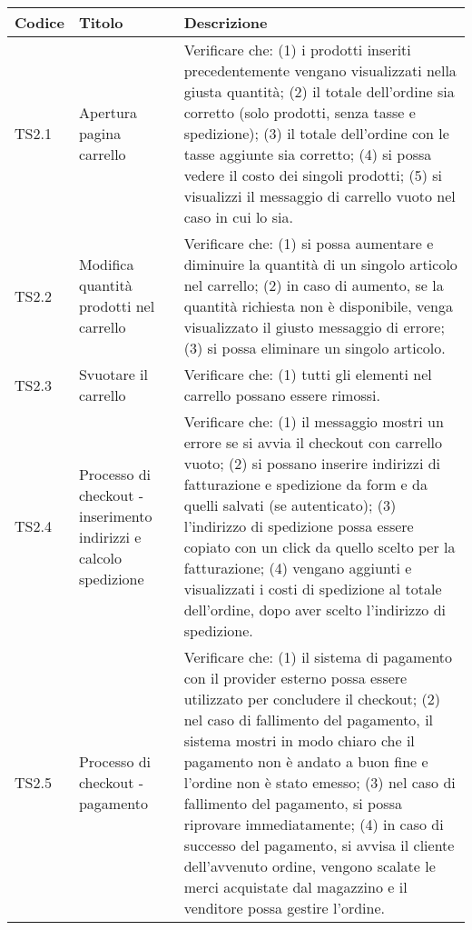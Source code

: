 \begin{center}
	\begin{longtable}{|p{1cm}|p{6.85cm}|p{7cm}|}
	\hline
	\rowcolor{lighter-grayer}
	\textbf{Codice} & \textbf{Titolo} & \textbf{Descrizione} \\
	\hline
	\endfirsthead



	\hline
	TS2.1 & Apertura pagina carrello & Verificare che: (1) i prodotti inseriti precedentemente vengano visualizzati nella giusta quantità;
													   (2) il totale dell'ordine sia corretto (solo prodotti, senza tasse e spedizione);
													   (3) il totale dell'ordine con le tasse aggiunte sia corretto;
													   (4) si possa vedere il costo dei singoli prodotti;
													   (5) si visualizzi il messaggio di carrello vuoto nel caso in cui lo sia. \\
	TS2.2 & Modifica quantità prodotti nel carrello & Verificare che:
													   (1) si possa aumentare e diminuire la quantità di un singolo articolo nel carrello;
													   (2) in caso di aumento, se la quantità richiesta non è disponibile, venga visualizzato il giusto messaggio di errore;
													   (3) si possa eliminare un singolo articolo.  \\
	TS2.3 & Svuotare il carrello & Verificare che: (1) tutti gli elementi nel carrello possano essere rimossi. \\
	TS2.4 & Processo di checkout - inserimento indirizzi e calcolo spedizione & Verificare che:
												   (1) il messaggio mostri un errore se si avvia il checkout con carrello vuoto;
												   (2) si possano inserire indirizzi di fatturazione e spedizione da form e da quelli salvati (se autenticato);
												   (3) l'indirizzo di spedizione possa essere copiato con un click da quello scelto per la fatturazione;
												   (4) vengano aggiunti e visualizzati i costi di spedizione al totale dell'ordine, dopo aver scelto l'indirizzo di spedizione. \\
	TS2.5 & Processo di checkout - pagamento & Verificare che:
												   (1) il sistema di pagamento con il provider esterno possa essere utilizzato per concludere il checkout;
												   (2) nel caso di fallimento del pagamento, il sistema mostri in modo chiaro che il pagamento non è andato a buon fine e l'ordine non è stato emesso;
												   (3) nel caso di fallimento del pagamento, si possa riprovare immediatamente;
												   (4) in caso di successo del pagamento, si avvisa il cliente dell'avvenuto ordine, vengono scalate le merci acquistate dal magazzino e il venditore possa gestire l'ordine. \\

\end{longtable}
\end{center}
